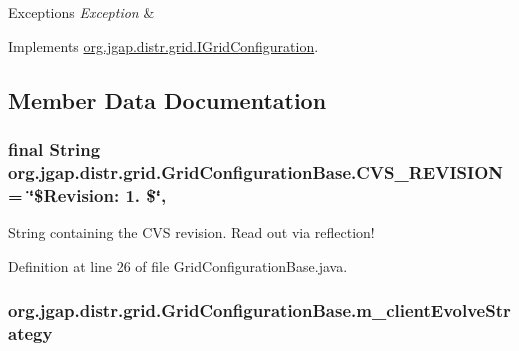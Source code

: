 \begin{DoxyExceptions}{Exceptions}
{\em Exception} & \\
\hline
\end{DoxyExceptions}


Implements \hyperlink{interfaceorg_1_1jgap_1_1distr_1_1grid_1_1_i_grid_configuration_a6f2088e7f1710e511fa3f26f8038a602}{org.\-jgap.\-distr.\-grid.\-I\-Grid\-Configuration}.



\subsection{Member Data Documentation}
\hypertarget{classorg_1_1jgap_1_1distr_1_1grid_1_1_grid_configuration_base_ab1aca63601396e6a62f315b8b2f4d521}{
\subsubsection[{C\-V\-S\-\_\-\-R\-E\-V\-I\-S\-I\-O\-N}]{\setlength{\rightskip}{0pt plus 5cm}final String org.\-jgap.\-distr.\-grid.\-Grid\-Configuration\-Base.\-C\-V\-S\-\_\-\-R\-E\-V\-I\-S\-I\-O\-N = \char`\"{}\$Revision\-: 1. \$\char`\"{}\hspace{0.3cm}{\ttfamily [static]}, {\ttfamily [private]}}}\label{classorg_1_1jgap_1_1distr_1_1grid_1_1_grid_configuration_base_ab1aca63601396e6a62f315b8b2f4d521}
String containing the C\-V\-S revision. Read out via reflection! 

Definition at line 26 of file Grid\-Configuration\-Base.\-java.

\hypertarget{classorg_1_1jgap_1_1distr_1_1grid_1_1_grid_configuration_base_abc9fe0279c66b82f247fd551ea043e33}{
\subsubsection[{m\-\_\-client\-Evolve\-Strategy}]{ org.\-jgap.\-distr.\-grid.\-Grid\-Configuration\-Base.\-m\-\_\-client\-Evolve\-Strategy\hspace{0.3cm}{\ttfamily [private]}}}\label{classorg_1_1jgap_1_1distr_1_1grid_1_1_grid_configuration_base_abc9fe0279c66b82f247fd551ea043e33}


